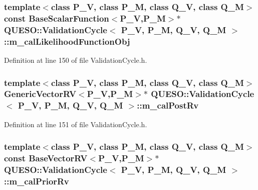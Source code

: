 \hypertarget{class_q_u_e_s_o_1_1_validation_cycle_a764d9a79a615317b0749ee69c2234d40}{
\subsubsection[{m\-\_\-cal\-Likelihood\-Function\-Obj}]{\setlength{\rightskip}{0pt plus 5cm}template$<$class P\-\_\-\-V, class P\-\_\-\-M, class Q\-\_\-\-V, class Q\-\_\-\-M$>$ const {\bf Base\-Scalar\-Function}$<$P\-\_\-\-V,P\-\_\-\-M$>$$\ast$ {\bf Q\-U\-E\-S\-O\-::\-Validation\-Cycle}$<$ P\-\_\-\-V, P\-\_\-\-M, Q\-\_\-\-V, Q\-\_\-\-M $>$\-::m\-\_\-cal\-Likelihood\-Function\-Obj\hspace{0.3cm}{\ttfamily [private]}}}\label{class_q_u_e_s_o_1_1_validation_cycle_a764d9a79a615317b0749ee69c2234d40}


Definition at line 150 of file Validation\-Cycle.\-h.

\hypertarget{class_q_u_e_s_o_1_1_validation_cycle_a535b6447a44ac7191e12e887d1710ef0}{
\subsubsection[{m\-\_\-cal\-Post\-Rv}]{\setlength{\rightskip}{0pt plus 5cm}template$<$class P\-\_\-\-V, class P\-\_\-\-M, class Q\-\_\-\-V, class Q\-\_\-\-M$>$ {\bf Generic\-Vector\-R\-V}$<$P\-\_\-\-V,P\-\_\-\-M$>$$\ast$ {\bf Q\-U\-E\-S\-O\-::\-Validation\-Cycle}$<$ P\-\_\-\-V, P\-\_\-\-M, Q\-\_\-\-V, Q\-\_\-\-M $>$\-::m\-\_\-cal\-Post\-Rv\hspace{0.3cm}{\ttfamily [private]}}}\label{class_q_u_e_s_o_1_1_validation_cycle_a535b6447a44ac7191e12e887d1710ef0}


Definition at line 151 of file Validation\-Cycle.\-h.

\hypertarget{class_q_u_e_s_o_1_1_validation_cycle_a9f8c93eb68908f51b728af2fffbfb4a8}{
\subsubsection[{m\-\_\-cal\-Prior\-Rv}]{\setlength{\rightskip}{0pt plus 5cm}template$<$class P\-\_\-\-V, class P\-\_\-\-M, class Q\-\_\-\-V, class Q\-\_\-\-M$>$ const {\bf Base\-Vector\-R\-V}$<$P\-\_\-\-V,P\-\_\-\-M$>$$\ast$ {\bf Q\-U\-E\-S\-O\-::\-Validation\-Cycle}$<$ P\-\_\-\-V, P\-\_\-\-M, Q\-\_\-\-V, Q\-\_\-\-M $>$\-::m\-\_\-cal\-Prior\-Rv\hspace{0.3cm}{\ttfamily [private]}}}\label{class_q_u_e_s_o_1_1_validation_cycle_a9f8c93eb68908f51b728af2fffbfb4a8}


